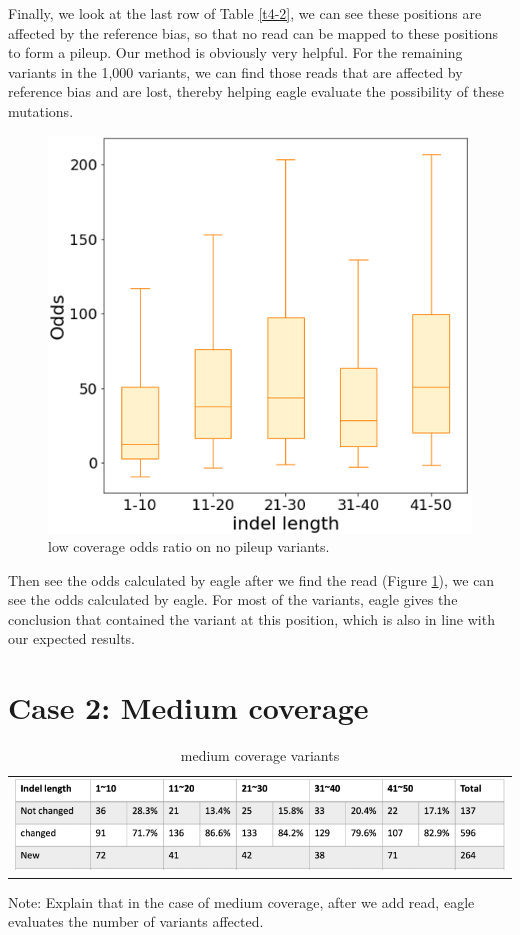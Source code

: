 Finally, we look at the last row of Table \ref{t4-2}, we can see these positions are affected by the reference bias, so that no read can be mapped to these positions to form a pileup. Our method is obviously very helpful. For the remaining variants in the 1,000 variants, we can find those reads that are affected by reference bias and are lost, thereby helping eagle evaluate the possibility of these mutations.

\begin{figure}[H]
    \centering
    \includegraphics[width=0.6\columnwidth]{body/image/4-6.png}
    \captionsetup{labelfont=bf}
    \renewcommand{\baselinestretch}{1.0}
    \caption[low coverage variants odds]{low coverage odds ratio on no pileup variants.}
    \label{f4-6}
\end{figure}

Then see the odds calculated by eagle after we find the read (Figure \ref{f4-6}), we can see the odds calculated by eagle. For most of the variants, eagle gives the conclusion that contained the variant at this position, which is also in line with our expected results.


\section{Case 2: Medium coverage}
\begin{center}
\begin{table}[h]
    \centering
    \caption[medium coverage variants]{medium coverage variants}
    \vspace{-0.5cm}
    \begin{tabular}{c}
        \includegraphics[width=1\textwidth]{body/image/t4-4.png}
    \end{tabular}
    \label{t4-4}
    {Note: Explain that in the case of medium coverage, after we add read, eagle evaluates the number of variants affected.}
\end{table}
\end{center}


